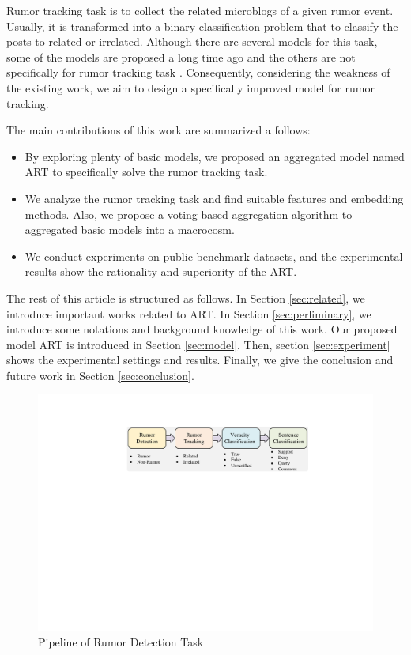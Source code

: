 Rumor tracking task is to collect the related microblogs of a given rumor event. Usually, it is transformed into a binary classification problem that to classify the posts to related or irrelated. Although there are several models for this task, some of the models are proposed a long time ago \cite{DBLP:conf/emnlp/QazvinianRRM11} and the others are not specifically for rumor tracking task \cite{DBLP:conf/www/ChengNB20}.
Consequently, considering the weakness of the existing work, we aim to design a specifically improved model for rumor tracking. 

The main contributions of this work are summarized a follows:
\begin{itemize}
	\item By exploring plenty of basic models, we proposed an aggregated model named ART to specifically solve the rumor tracking task. 
	\item We analyze the rumor tracking task and find suitable features and embedding methods. Also, we propose a voting based aggregation algorithm to aggregated basic models into a macrocosm.
	\item We conduct experiments on public benchmark datasets, and the experimental results show the rationality and superiority of the ART.
\end{itemize}

The rest of this article is structured as follows. In Section \ref{sec:related}, we introduce important works related to ART. In Section \ref{sec:perliminary}, we introduce some notations and background knowledge of this work. Our proposed model ART is introduced in Section \ref{sec:model}. Then, section \ref{sec:experiment} shows the experimental settings and results. Finally, we give the conclusion and future work in Section \ref{sec:conclusion}.

\begin{figure}[tbp]
	\hspace{0ex}
	\vspace{0ex}
	\centering
	\includegraphics[width = \textwidth]{fig/pipeline}
	\caption{Pipeline of Rumor Detection Task}
	\label{fig:pipeline}
\end{figure}